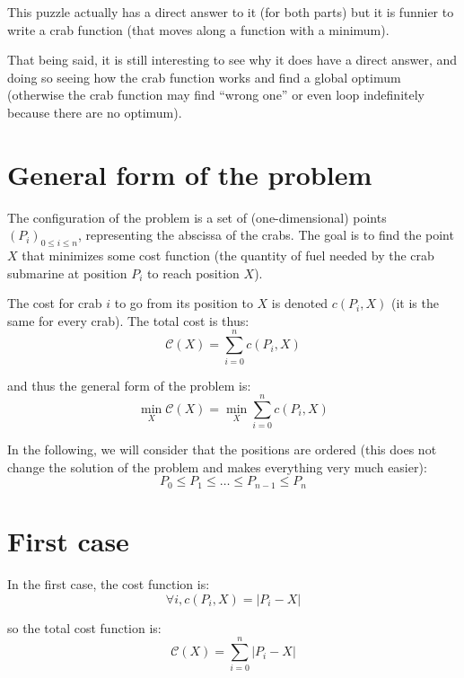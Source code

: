 \documentclass[a4paper,11pt]{article}
\begin{document}
This puzzle actually has a direct answer to it (for both parts) but it is
funnier to write a crab function (that moves along a function with a minimum).

That being said, it is still interesting to see why it does have a direct
answer, and doing so seeing how the crab function works and find a global
optimum (otherwise the crab function may find ``wrong one'' or even loop
indefinitely because there are no optimum).


\section{General form of the problem}

The configuration of the problem is a set of (one-dimensional) points 
$(P_i)_{0 \leq i \leq n}$, representing the abscissa of the crabs. The goal is
to find the point $X$ that minimizes some cost function (the quantity of fuel
needed by the crab submarine at position $P_i$ to reach position $X$).

The cost for crab $i$ to go from its position to $X$ is denoted $c(P_i,X)$ (it
is the same for every crab). The total cost is thus:
\begin{equation}
\mathcal{C}(X) = \sum_{i = 0}^n c(P_i, X)
\end{equation}

\noindent and thus the general form of the problem is:
\begin{equation}
\min_X \mathcal{C}(X) = \min_X \sum_{i = 0}^n c(P_i, X)
\end{equation}

In the following, we will consider that the positions are ordered (this does not
change the solution of the problem and makes everything very much easier):
$$P_0 \leq P_1 \leq \ldots \leq P_{n - 1} \leq P_n$$


\section{First case}

In the first case, the cost function is:
\begin{equation}
\forall i, c(P_i, X) = |P_i - X|
\end{equation}

\noindent so the total cost function is:
\begin{equation}
\mathcal{C}(X) = \sum_{i = 0}^n |P_i - X|
\end{equation}
\end{document}
